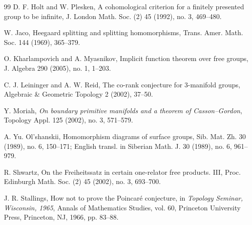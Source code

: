 \documentclass{article}
\begin{document}
\begin{thebibliography}{99}
D. F. Holt and W. Plesken,
A cohomological criterion for a finitely presented group to be infinite,
J. London Math. Soc. (2) 45 (1992), no. 3, 469--480.

W. Jaco,
Heegaard splitting and splitting homomorphisms,
Trans. Amer. Math. Soc. 144 (1969), 365--379.

O. Kharlampovich and A. Myasnikov,
Implicit function theorem over free groups,
J. Algebra 290 (2005), no. 1, 1--203.

C. J. Leininger and A. W. Reid,
The co-rank conjecture for 3-manifold groups,
Algebraic \& Geometric Topology 2 (2002), 37--50.

Y. Moriah,
\textit{On boundary primitive manifolds and a theorem of Casson--Gordon},
Topology Appl. 125 (2002), no. 3, 571--579.

A. Yu. Ol'shanskii,
Homomorphism diagrams of surface groups,
Sib. Mat. Zh. 30 (1989), no. 6, 150--171;
English transl. in Siberian Math. J. 30 (1989), no. 6, 961--979.

R. Shwartz,
On the Freiheitssatz in certain one-relator free products. III,
Proc. Edinburgh Math. Soc. (2) 45 (2002), no. 3, 693--700.

J. R. Stallings,
How not to prove the Poincar\'e conjecture,
in \textit{Topology Seminar, Wisconsin, 1965},
Annals of Mathematics Studies, vol. 60,
Princeton University Press, Princeton, NJ, 1966, pp. 83--88.

\end{thebibliography}
\end{document}
